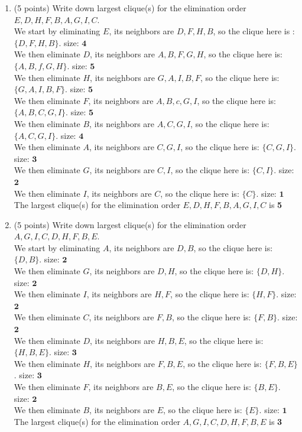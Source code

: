 \documentclass[a3paper,12pt]{extarticle} %
\begin{document}
\begin{enumerate}
\item (5 points) Write down largest clique(s) for the elimination order \(E, D, H, F, B, A, G, I, C\).
\\ We start by eliminating \(E\), its neighbors are \(D, F, H, B\), so the clique here is :\(\{D, F, H, B\}\). size: \(\textbf{4}\)
\\ We then eliminate \(D\), its neighbors are \(A, B, F, G, H\), so the clique here is: \(\{A, B, f, G, H\}\). size: \(\textbf{5}\)
\\ We then eliminate \(H\), its neighbors are \(G, A, I, B, F\), so the clique here is: \(\{G, A, I, B, F\}\). size: \(\textbf{5}\)
\\ We then eliminate \(F\), its neighbors are \(A, B, c, G, I\), so the clique here is: \(\{A, B, C, G, I\}\). size: \(\textbf{5}\)
\\ We then eliminate \(B\), its neighbors are \(A, C, G, I\), so the clique here is: \(\{A, C, G, I\}\). size: \(\textbf{4}\)
\\ We then eliminate \(A\), its neighbors are \(C, G, I\), so the clique here is: \(\{C, G, I\}\). size: \(\textbf{3}\)
\\ We then eliminate \(G\), its neighbors are \(C, I\), so the clique here is: \(\{C, I\}\). size: \(\textbf{2}\)
\\ We then eliminate \(I\), its neighbors are \(C\), so the clique here is: \(\{C\}\). size: \(\textbf{1}\)
\\ The largest clique(s) for the elimination order \(E, D, H, F, B, A, G, I, C\) is \textbf{5}

\item (5 points) Write down largest clique(s) for the elimination order \(A, G, I, C, D, H, F, B, E\).
\\ We start by eliminating \(A\), its neighbors are \(D, B\), so the clique here is: \(\{D, B\}\). size: \(\textbf{2}\)
\\ We then eliminate \(G\), its neighbors are \(D, H\),     so the clique here is: \(\{D, H\}\). size: \(\textbf{2}\)
\\ We then eliminate \(I\), its neighbors are \(H, F\), so the clique here is: \(\{H, F\}\). size: \(\textbf{2}\)
\\ We then eliminate \(C\), its neighbors are \(F, B\), so the clique here is: \(\{F, B\}\). size: \(\textbf{2}\)
\\ We then eliminate \(D\), its neighbors are \(H, B, E\), so the clique here is: \(\{H, B, E\}\). size: \(\textbf{3}\)
\\ We then eliminate \(H\), its neighbors are \(F, B, E\), so the clique here is: \(\{F, B, E\}\). size: \(\textbf{3}\)
\\ We then eliminate \(F\), its neighbors are \(B, E\), so the clique here is: \(\{B, E\}\). size: \(\textbf{2}\)
\\ We then eliminate \(B\), its neighbors are \(E\), so the clique here is: \(\{E\}\). size: \(\textbf{1}\)
\\ The largest clique(s) for the elimination order \(A, G, I, C, D, H, F, B, E\) is \textbf{3}


\end{enumerate}
\end{document}
